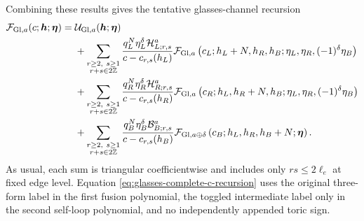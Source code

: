 \documentclass[11pt]{article}
\newcommand{\F}{\mathcal F}
\newcommand{\U}{\mathcal U}
\newcommand{\Hcal}{\mathcal H}
\newcommand{\Bcal}{\mathcal B}
\begin{document}
Combining these results gives the tentative glasses-channel recursion
\begin{align}
 \F_{{\rm Gl},a}(c;\bm h;\bm\eta)
 ={}&\U_{{\rm Gl},a}(\bm h;\bm\eta)
 \nonumber\\
 &+\sum_{\substack{r\ge2,\ s\ge1\\r+s\in2\mathbb Z}}
 \frac{q_L^N\eta_L^\delta\Hcal_{L;r,s}^{a}}
      {c-c_{r,s}(h_L)}
 \F_{{\rm Gl},a}
 \left(c_L;h_L+N,h_R,h_B;
       \eta_L,\eta_R,(-1)^\delta\eta_B\right)
 \nonumber\\
 &+\sum_{\substack{r\ge2,\ s\ge1\\r+s\in2\mathbb Z}}
 \frac{q_R^N\eta_R^\delta\Hcal_{R;r,s}^{a}}
      {c-c_{r,s}(h_R)}
 \F_{{\rm Gl},a}
 \left(c_R;h_L,h_R+N,h_B;
       \eta_L,\eta_R,(-1)^\delta\eta_B\right)
 \nonumber\\
 &+\sum_{\substack{r\ge2,\ s\ge1\\r+s\in2\mathbb Z}}
 \frac{q_B^N\eta_B^\delta\Bcal_{B;r,s}^{a}}
      {c-c_{r,s}(h_B)}
 \F_{{\rm Gl},a\oplus\delta}
 \left(c_B;h_L,h_R,h_B+N;\bm\eta\right).
 \label{eq:glasses-complete-c-recursion}
\end{align}
As usual, each sum is triangular coefficientwise and includes only
\(rs\le2\ell_e\) at fixed edge level.  Equation
\eqref{eq:glasses-complete-c-recursion} uses the original three-form label in
the first fusion polynomial, the toggled intermediate label only in the
second self-loop polynomial, and no independently appended toric sign.
\end{document}
